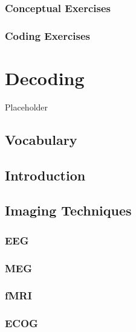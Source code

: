 \documentclass[
]{book}
\begin{document}
\hypertarget{conceptual-exercises}{%
\subsection{Conceptual Exercises}\label{conceptual-exercises}}

\hypertarget{coding-exercises}{%
\subsection{Coding Exercises}\label{coding-exercises}}

\hypertarget{Ch7}{%
\chapter{Decoding}\label{Ch7}}

Placeholder

\hypertarget{vocabulary}{%
\section{Vocabulary}\label{vocabulary}}

\hypertarget{introduction}{%
\section{Introduction}\label{introduction}}

\hypertarget{imaging-techniques}{%
\section{Imaging Techniques}\label{imaging-techniques}}

\hypertarget{eeg}{%
\subsection{EEG}\label{eeg}}

\hypertarget{meg}{%
\subsection{MEG}\label{meg}}

\hypertarget{fmri}{%
\subsection{fMRI}\label{fmri}}

\hypertarget{ecog}{%
\subsection{ECOG}\label{ecog}}
\end{document}
